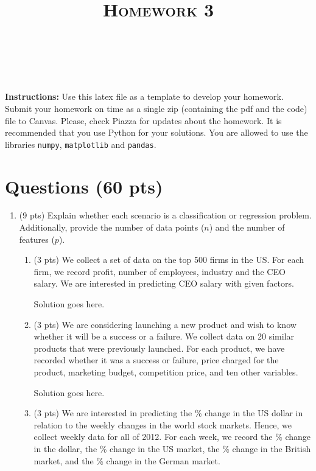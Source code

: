 \documentclass[a4paper]{article}
\title{\textsc{Homework 3}} %
\author{
\red{$>>$NAME HERE$<<$} \\
\red{$>>$ID HERE$<<$}\\
}
\date{}
\theoremstyle{definition}
\newenvironment{soln}{
    \leavevmode\color{blue}\ignorespaces
}{}
\begin{document}
\maketitle 


\textbf{Instructions:} 
Use this latex file as a template to develop your homework.
Submit your homework on time as a single zip (containing the pdf and the code) file to Canvas. Please, check Piazza for updates about the homework. It is recommended that you use Python for your solutions. You are allowed to use the libraries {\tt numpy}, {\tt matplotlib} and {\tt pandas}.
\section{Questions (60 pts)}
\begin{enumerate}
\item (9 pts) Explain whether each scenario is a classification or regression problem. Additionally, provide the number of data points ($n$) and the number of features ($p$).

\begin{enumerate}
	\item (3 pts) We collect a set of data on the top 500 firms in the US. For each firm, we record profit, number of employees, industry and the CEO salary. We are interested in predicting CEO salary with given factors.
	
	\begin{soln}  Solution goes here. \end{soln}
	
	\item (3 pts) We are considering launching a new product and wish to know whether it will be a success or a failure. We collect data on 20 similar products that were previously launched. For each product, we have recorded whether it was a success or failure, price charged for the product, marketing budget, competition price, and ten other variables.
	
	\begin{soln}  Solution goes here. \end{soln}
	
	\item (3 pts) We are interested in predicting the \% change in the US dollar in relation to the weekly changes in the world stock markets. Hence, we collect weekly data for all of 2012. For each week, we record the \% change in the dollar, the \% change in the US market, the \% change in the British market, and the \% change in the German market.
	

\end{enumerate}
\end{enumerate}
\end{document}

